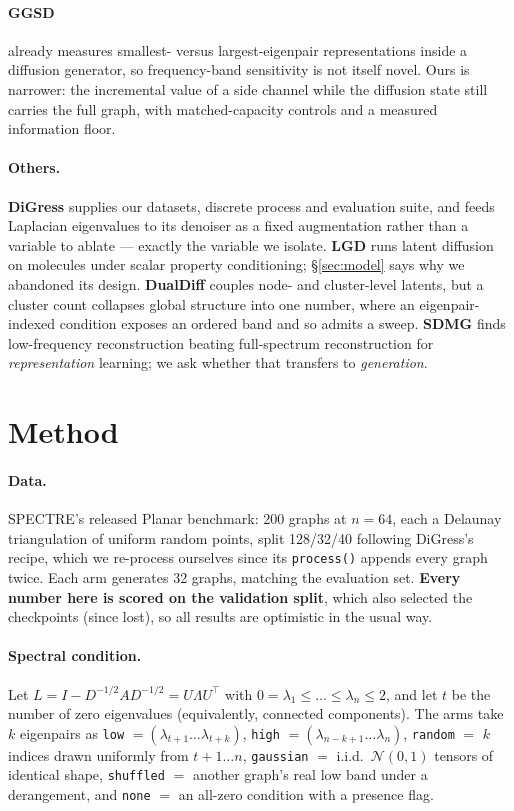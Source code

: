 \documentclass[11pt]{article}
\begin{document}
\paragraph{GGSD} \citep{minello2025ggsd} already measures smallest- versus largest-eigenpair
representations inside a diffusion generator, so frequency-band sensitivity is not itself novel.
Ours is narrower: the incremental value of a side channel while the diffusion state
still carries the full graph, with matched-capacity controls and a measured information floor.

\paragraph{Others.} \textbf{DiGress} \citep{vignac2023digress} supplies our datasets, discrete
process and evaluation suite, and feeds Laplacian eigenvalues to its denoiser as a fixed
augmentation rather than a variable to ablate --- exactly the variable we isolate. \textbf{LGD}
\citep{zhou2024lgd} runs latent diffusion on molecules under scalar property conditioning;
\S\ref{sec:model} says why we abandoned its design. \textbf{DualDiff} \citep{xie2026dualdiff}
couples node- and cluster-level latents, but a cluster count collapses global structure into one
number, where an eigenpair-indexed condition exposes an ordered band and so admits a sweep.
\textbf{SDMG} \citep{zhu2025sdmg} finds low-frequency reconstruction beating full-spectrum
reconstruction for \emph{representation} learning; we ask whether that transfers to
\emph{generation}.

\section{Method}
\label{sec:method}

\paragraph{Data.} SPECTRE's released Planar benchmark: 200 graphs at $n{=}64$, each a Delaunay
triangulation of uniform random points, split 128/32/40 following DiGress's recipe, which we re-process ourselves since its
\texttt{process()} appends every graph twice. Each arm generates 32 graphs, matching the
evaluation set.
\textbf{Every number here is scored on the validation split}, which also selected the checkpoints
(since lost), so all results are optimistic in the usual way.

\paragraph{Spectral condition.} Let $L = I - D^{-1/2} A D^{-1/2} = U \Lambda U^\top$ with $0 =
\lambda_1 \le \dots \le \lambda_n \le 2$, and let $t$ be the number of zero eigenvalues
(equivalently, connected components). The arms take $k$ eigenpairs as \texttt{low} $=
(\lambda_{t+1} \dots \lambda_{t+k})$, \texttt{high} $= (\lambda_{n-k+1} \dots \lambda_n)$,
\texttt{random} $=$ $k$ indices drawn uniformly from $t{+}1 \dots n$, \texttt{gaussian} $=$
i.i.d.\ $\mathcal{N}(0,1)$ tensors of identical shape, \texttt{shuffled} $=$ another graph's real
low band under a derangement, and \texttt{none} $=$ an all-zero condition with a presence flag.
\end{document}
